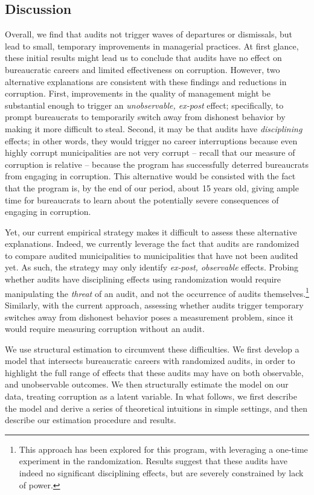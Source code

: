\documentclass[12pt,a4paper]{article}
\theoremstyle{definition}
\begin{document}
\subsection{Discussion}

Overall, we find that audits not trigger waves of departures or dismissals, but lead to small, temporary improvements in managerial practices. At first glance, these initial results might lead us to conclude that audits have no effect on bureaucratic careers and limited effectiveness on corruption. However, two alternative explanations are consistent with these findings and reductions in corruption. First, improvements in the quality of management might be substantial enough to trigger an \emph{unobservable, ex-post} effect; specifically, to prompt bureaucrats to temporarily switch away from dishonest behavior by making it more difficult to steal. Second, it may be that audits have \emph{disciplining} effects; in other words, they would trigger no career interruptions because even highly corrupt municipalities are not very corrupt -- recall that our measure of corruption is relative -- because the program has successfully deterred bureaucrats from engaging in corruption. This alternative would be consisted with the fact that the program is, by the end of our period, about 15 years old, giving ample time for bureaucrats to learn about the potentially severe consequences of engaging in corruption. 

Yet, our current empirical strategy makes it difficult to assess these alternative explanations. Indeed, we currently leverage the fact that audits are randomized to compare audited municipalities to municipalities that have not been audited yet. As such, the strategy may only identify \emph{ex-post, observable} effects. Probing whether audits have disciplining effects using randomization would require manipulating the \emph{threat} of an audit, and not the occurrence of audits themselves.\footnote{This approach has been explored for this program, with \citet{poulsen2019corruption} leveraging a one-time experiment in the randomization. Results suggest that these audits have indeed no significant disciplining effects, but are severely constrained by lack of power.} Similarly, with the current approach, assessing whether audits trigger temporary switches away from dishonest behavior poses a measurement problem, since it would require measuring corruption without an audit. 

We use structural estimation to circumvent these difficulties. We first develop a model that intersects bureaucratic careers with randomized audits, in order to highlight the full range of effects that these audits may have on both observable, and unobservable outcomes. We then structurally estimate the model on our data, treating corruption as a latent variable. In what follows, we first describe the model and derive a series of theoretical intuitions in simple settings, and then describe our estimation procedure and results.
\end{document}
